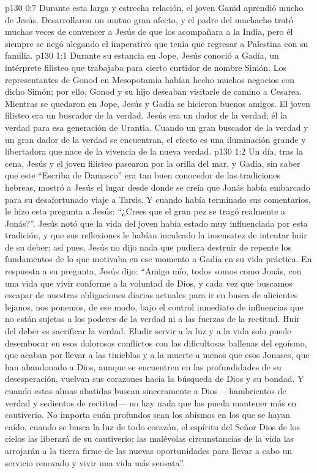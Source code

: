\vs p130 0:7 Durante esta larga y estrecha relación, el joven Ganid aprendió mucho de Jesús. Desarrollaron un mutuo gran afecto, y el padre del muchacho trató muchas veces de convencer a Jesús de que los acompañara a la India, pero él siempre se negó alegando el imperativo que tenía que regresar a Palestina con su familia.
\vs p130 1:1 Durante su estancia en Jope, Jesús conoció a Gadía, un intérprete filisteo que trabajaba para cierto curtidor de nombre Simón. Los representantes de Gonod en Mesopotamia habían hecho muchos negocios con dicho Simón; por ello, Gonod y su hijo deseaban visitarle de camino a Cesarea. Mientras se quedaron en Jope, Jesús y Gadía se hicieron buenos amigos. El joven filisteo era un buscador de la verdad. Jesús era un dador de la verdad; él  la verdad para esa generación de Urantia. Cuando un gran buscador de la verdad y un gran dador de la verdad se encuentran, el efecto es una iluminación grande y libertadora que nace de la vivencia de la nueva verdad.
\vs p130 1:2 Un día, tras la cena, Jesús y el joven filisteo pasearon por la orilla del mar, y Gadía, sin saber que este “Escriba de Damasco” era tan buen conocedor de las tradiciones hebreas, mostró a Jesús el lugar desde donde se creía que Jonás había embarcado para su desafortunado viaje a Tarsis. Y cuando había terminado sus comentarios, le hizo esta pregunta a Jesús: “¿Crees que el gran pez se tragó realmente a Jonás?”. Jesús notó que la vida del joven había estado muy influenciada por esta tradición, y que sus reflexiones le habían inculcado la insensatez de intentar huir de su deber; así pues, Jesús no dijo nada que pudiera destruir de repente los fundamentos de lo que motivaba en ese momento a Gadía en su vida práctica. En respuesta a su pregunta, Jesús dijo: “Amigo mío, todos somos como Jonás, con una vida que vivir conforme a la voluntad de Dios, y cada vez que buscamos escapar de nuestras obligaciones diarias actuales para ir en busca de alicientes lejanos, nos ponemos, de ese modo, bajo el control inmediato de influencias que no están sujetas a los poderes de la verdad ni a las fuerzas de la rectitud. Huir del deber es sacrificar la verdad. Eludir servir a la luz y a la vida solo puede desembocar en esos dolorosos conflictos con las dificultosas ballenas del egoísmo, que acaban por llevar a las tinieblas y a la muerte a menos que esos Jonases, que han abandonado a Dios, aunque se encuentren en las profundidades de su desesperación, vuelvan sus corazones hacia la búsqueda de Dios y su bondad. Y cuando estas almas abatidas buscan sinceramente a Dios ---hambrientos de verdad y sedientos de rectitud--- no hay nada que las pueda mantener más en cautiverio. No importa cuán profundos sean los abismos en los que se hayan caído, cuando se busca la luz de todo corazón, el espíritu del Señor Dios de los cielos las liberará de su cautiverio; las malévolas circunstancias de la vida las arrojarán a la tierra firme de las nuevas oportunidades para llevar a cabo un servicio renovado y vivir una vida más sensata”.
